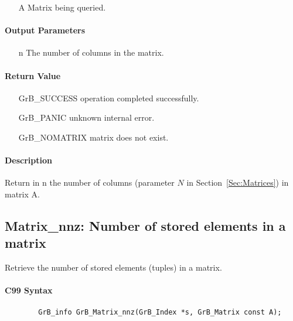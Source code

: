 \begin{itemize}[leftmargin=1.1in]
    \item[{\sf A}] Matrix being queried.
\end{itemize}

\paragraph{Output Parameters}
\begin{itemize}[leftmargin=1.1in]
    \item[{\sf n}] The number of columns in the matrix.
\end{itemize}

\paragraph{Return Value}

\begin{itemize}[leftmargin=2.1in]
\item[{\sf GrB\_SUCCESS}]   operation completed successfully.
\item[{\sf GrB\_PANIC}]     unknown internal error.
\item[{\sf GrB\_NOMATRIX}]  matrix does not exist.
\end{itemize}

\paragraph{Description}

Return in {\sf n} the number of columns (parameter $N$ in Section~\ref{Sec:Matrices}) in matrix {\sf A}.

\subsection{{\sf Matrix\_nnz}: Number of stored elements in a matrix}

Retrieve the number of stored elements (tuples) in a matrix.

\paragraph{C99 Syntax}

\begin{verbatim}
        GrB_info GrB_Matrix_nnz(GrB_Index *s, GrB_Matrix const A);
\end{verbatim}

